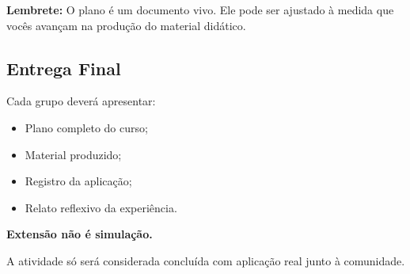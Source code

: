 \documentclass[12pt,a4paper]{article}
\begin{document}
\begin{boxObservacao}
\textbf{Lembrete:} O plano é um documento vivo. Ele pode ser ajustado à medida que vocês avançam na produção do material didático.
\end{boxObservacao}


\subsection{Entrega Final}

Cada grupo deverá apresentar:

\begin{itemize}
    \item Plano completo do curso;
    \item Material produzido;
    \item Registro da aplicação;
    \item Relato reflexivo da experiência.
\end{itemize}

\begin{boxObservacao}
\textbf{Extensão não é simulação.}

A atividade só será considerada concluída com aplicação real junto à comunidade.
\end{boxObservacao}

\end{document}
